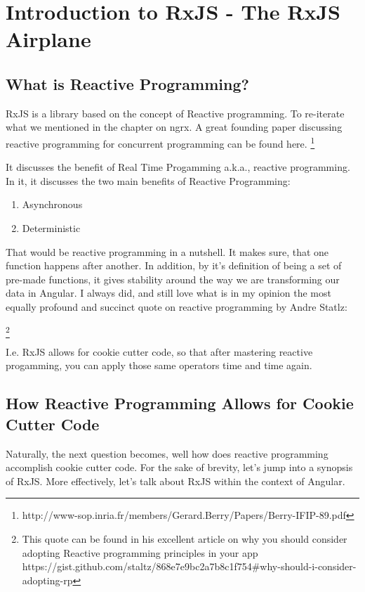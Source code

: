 \chapter{ Introduction to RxJS - The RxJS Airplane}

\section{ What is Reactive Programming?}

RxJS is a library based on the concept of Reactive programming. To re-iterate 
what we mentioned in the chapter on ngrx. A great founding paper discussing 
reactive programming for concurrent programming can be found here. 
\footnote{http://www-sop.inria.fr/members/Gerard.Berry/Papers/Berry-IFIP-89.pdf}

It discusses the benefit of Real Time Progamming a.k.a., reactive programming.
In it, it discusses the two main benefits of Reactive Programming:
\begin{enumerate}
  \item Asynchronous
  \item Deterministic
\end{enumerate}

That would be reactive programming in a nutshell. It makes sure, that one 
function happens after another. In addition, by it's definition of being 
a set of pre-made functions, it gives stability around the way we are 
transforming our data in Angular. I always did, and still love what is in my 
opinion the most equally profound and succinct quote on reactive programming by 
Andre Statlz: 

\begin{quote}
\end{quote} 
\footnote{This quote can be found in his excellent article on why you should 
consider adopting Reactive programming principles in your app 
https://gist.github.com/staltz/868e7e9bc2a7b8c1f754\#why-should-i-consider-adopting-rp}

I.e. RxJS allows for cookie cutter code, so that after mastering reactive 
progamming, you can apply those same operators time and time again.

\section{How Reactive Programming Allows for Cookie Cutter Code}
Naturally, the next question becomes, well how does reactive programming accomplish cookie 
cutter code. For the sake of brevity, let's jump into a synopsis of RxJS. More
effectively, let's talk about RxJS within the context of Angular.

